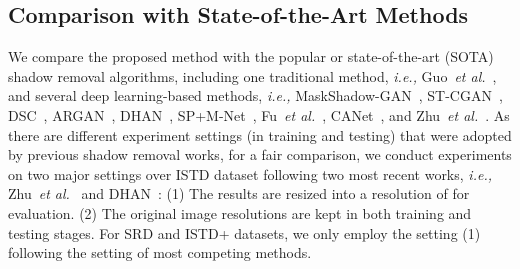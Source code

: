 \documentclass[letterpaper]{article} \usepackage{aaai23}  \usepackage{times}  \usepackage{helvet}  \usepackage{courier}  \usepackage[hyphens]{url}  \usepackage{graphicx} \urlstyle{rm} \def\UrlFont{\rm}  \usepackage{natbib}  \usepackage{caption} \frenchspacing  \setlength{\pdfpagewidth}{8.5in} \setlength{\pdfpageheight}{11in} \usepackage{algorithm}
\def\etal{\emph{et al.}}
\newcommand{\ie}{\textit{i.e., }}
\begin{document}
\subsection{Comparison with State-of-the-Art Methods}
We compare the proposed method with the popular or state-of-the-art (SOTA) shadow removal algorithms, including one traditional method, \ie Guo~\etal~\cite{guo2012paired}, and several deep learning-based methods, \ie MaskShadow-GAN~\cite{hu2019mask}, ST-CGAN~\cite{wang2018stacked}, DSC~\cite{hu2019direction},  ARGAN~\cite{ding2019argan}, DHAN~\cite{cun2020towards}, SP+M-Net~\cite{le2019shadow}, Fu~\etal~\cite{fu2021auto}, CANet~\cite{chen2021canet}, and Zhu~\etal~\cite{zhu2022efficient}.
As there are different experiment settings (in training and testing) that were adopted by previous shadow removal works, for a fair comparison, we conduct experiments on two major settings over ISTD dataset following two most recent works, \ie Zhu~\etal~\cite{zhu2022efficient} and DHAN~\cite{cun2020towards}: (1) 
The results are resized into a resolution of  for evaluation. (2) The original image resolutions are kept in both training and testing stages. For SRD and ISTD+ datasets, we only employ the setting (1) following the setting of most competing methods.
\end{document}
